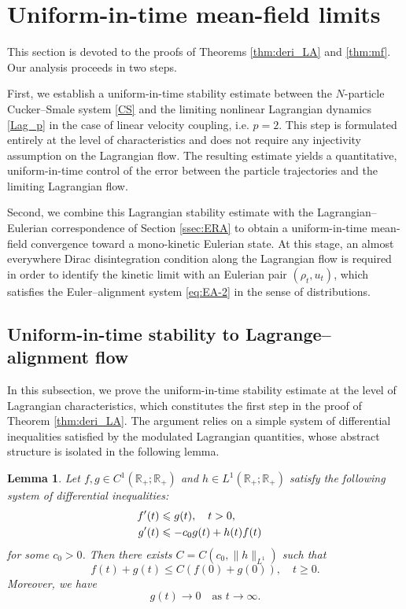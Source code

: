 \documentclass[10pt,reqno]{amsart}
\renewcommand{\geq}{\geqslant}
\renewcommand{\leq}{\leqslant}
\numberwithin{equation}{section}
\newtheorem{lemma}{Lemma}[section]
\newcommand{\R}{\mathbb R}
\begin{document}
 
%
%
%                      
%
%


 \section{Uniform-in-time mean-field limits}\label{sec:uni_mf}
 
This section is devoted to the proofs of Theorems \ref{thm:deri_LA} and \ref{thm:mf}. Our analysis proceeds in two steps.

First, we establish a uniform-in-time stability estimate between the $N$-particle Cucker--Smale system \eqref{CS} and the limiting nonlinear Lagrangian dynamics \eqref{Lag_p} in the case of linear velocity coupling, i.e.  $p=2$. This step is formulated entirely at the level of characteristics and does not require any injectivity assumption on the Lagrangian flow. The resulting estimate yields a quantitative, uniform-in-time control of the error between the particle trajectories and the limiting Lagrangian flow.

Second, we combine this Lagrangian stability estimate with the Lagrangian--Eulerian correspondence of Section \ref{ssec:ERA} to obtain a uniform-in-time mean-field convergence toward a mono-kinetic Eulerian state. At this stage, an almost everywhere Dirac disintegration condition along the Lagrangian flow is required in order to identify the kinetic limit with an Eulerian pair $(\rho_t,u_t)$, which satisfies the Euler--alignment system \eqref{eq:EA-2} in the sense of distributions.
 
 
%
%
%
%
%
 
 
\subsection{Uniform-in-time stability to Lagrange--alignment flow}
In this subsection, we prove the uniform-in-time stability estimate at the level of Lagrangian characteristics, which constitutes the first step in the proof of Theorem \ref{thm:deri_LA}. The argument relies on a simple system of differential inequalities satisfied by the modulated Lagrangian quantities, whose abstract structure is isolated in the following lemma.

\begin{lemma}\label{lem1} Let $f,g \in C^1(\R_+; \R_+)$ and $h \in L^1(\R_+;\R_+)$ satisfy the following system of differential inequalities:
\begin{align*}
f'(t) &\leq g(t),\quad t > 0,\cr
g'(t) &\leq -c_0 g(t) + h(t) f(t)
\end{align*}
for some $c_0 > 0$. Then there exists $C = C(c_0, \|h\|_{L^1})$ such that
\[
f(t) + g(t) \leq C (f(0) + g(0)), \quad t \geq 0.
\] 
Moreover, we have
\[
g(t) \to 0 \quad \mbox{as } t \to \infty.
\]
\end{lemma}
\end{document}
